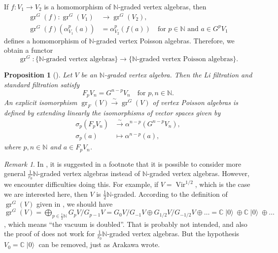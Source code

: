 \documentclass[a4paper, 12pt, reqno]{amsart}
\newtheorem{proposition}[theorem]{Proposition}
\theoremstyle{remark}
\newtheorem{remark}[theorem]{Remark}
\DeclareMathOperator{\Vir}{Vir}
\DeclareMathOperator{\gr}{gr}
\DeclareMathOperator{\vac}{|0\rangle}
\begin{document}
If $f: V_1 \to V_2$ is a homomorphism of $\mathbb{N}$-graded vertex algebras, then
\begin{align*}
  \gr^G(f): \gr^G(V_1) &\to \gr^G(V_2), \\
  \gr^G(f)(\alpha_{V_1}^p(a)) &= \alpha_{V_2}^p(f(a)) \quad \text{for $p \in \mathbb{N}$ and $a \in G^pV_1$}
\end{align*}
defines a homomorphism of $\mathbb{N}$-graded vertex Poisson algebras.
Therefore, we obtain a functor
\begin{equation*}
  \gr^G: \{\text{$\mathbb{N}$-graded vertex algebras}\} \to \{\text{$\mathbb{N}$-graded vertex Poisson algebras}\}.
\end{equation*}

\begin{proposition}[{\cite[Proposition 2.6.1]{arakawa_remark_2012}}]
  \label{prp:15}
  Let $V$ be an $\mathbb{N}$-graded vertex algebra.
  Then the Li filtration and standard filtration satisfy
  \begin{equation*}
    F_pV_n = G^{n - p}V_n \quad \text{for $p, n \in \mathbb{N}$}.
  \end{equation*}
  An explicit isomorphism $\gr_F(V) \xrightarrow{\sim} \gr^G(V)$ of vertex Poisson algebras is defined by extending linearly the isomorphisms of vector spaces given by
  \begin{align*}
    \sigma_p(F_pV_n) &\xrightarrow{\sim} \alpha^{n - p}(G^{n - p}V_n), \\
    \sigma_p(a) &\mapsto \alpha^{n - p}(a),
  \end{align*}
  where $p, n \in \mathbb{N}$ and $a \in F_pV_n$.
\end{proposition}

\begin{remark}
  \label{rmk:38}
  In \cite{arakawa_remark_2012}, it is suggested in a footnote that it is possible to consider more general $\tfrac{1}{r_0}\mathbb{N}$-graded vertex algebras instead of $\mathbb{N}$-graded vertex algebras.
  However, we encounter difficulties doing this.
  For example, if $V = \Vir^{1/2}$, which is the case we are interested here, then $V$ is $\tfrac{1}{2}\mathbb{N}$-graded.
  According to the definition of $\gr^G(V)$ given in \cite{arakawa_remark_2012}, we should have $\gr^G(V) = \bigoplus_{p \in \frac{1}{2}\mathbb{N}}G_pV/G_{p - 1}V = G_0V/G_{-1}V \oplus G_{1/2}V/G_{-1/2}V \oplus \dots = \mathbb{C}\vac \oplus \mathbb{C}\vac \oplus \dots$, which means ``the vacuum is doubled''.
  That is probably not intended, and also the proof of \cite[Proposition 2.6.1]{arakawa_remark_2012} does not work for $\tfrac{1}{r_0}\mathbb{N}$-graded vertex algebras.
  But the hypothesis $V_0 = \mathbb{C}\vac$ can be removed, just as Arakawa wrote.
\end{remark}
\end{document}
